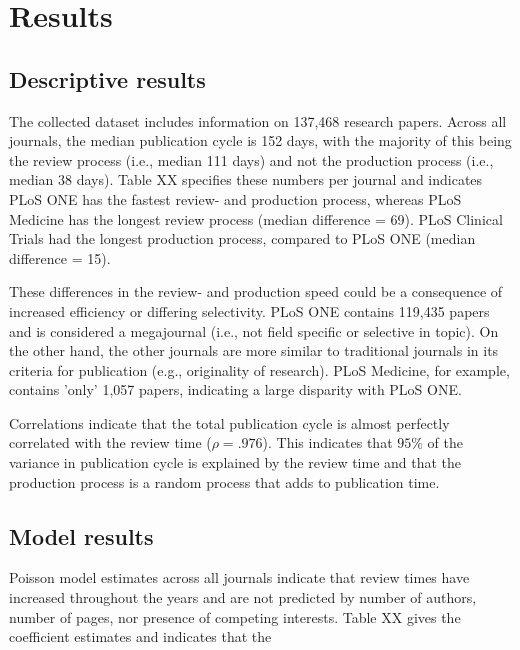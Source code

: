 \section*{Results}
\subsection*{Descriptive results}
The collected dataset includes information on 137,468 research papers. Across all journals, the median publication cycle is 152 days, with the majority of this being the review process (i.e., median 111 days) and not the production process (i.e., median 38 days). Table XX specifies these numbers per journal and indicates PLoS ONE has the fastest review- and production process, whereas PLoS Medicine has the longest review process (median difference = 69). PLoS Clinical Trials had the longest production process, compared to PLoS ONE (median difference = 15).

These differences in the review- and production speed could be a consequence of increased efficiency or differing selectivity. PLoS ONE contains 119,435 papers and is considered a megajournal (i.e., not field specific or selective in topic). On the other hand, the other journals are more similar to traditional journals in its criteria for publication (e.g., originality of research). PLoS Medicine, for example, contains 'only' 1,057 papers, indicating a large disparity with PLoS ONE. 

Correlations indicate that the total publication cycle is almost perfectly correlated with the review time ($\rho=.976$). This indicates that $95\%$ of the variance in publication cycle is explained by the review time and that the production process is a random process that adds to publication time.

\subsection*{Model results}
Poisson model estimates across all journals indicate that review times have increased throughout the years and are not predicted by number of authors, number of pages, nor presence of competing interests. Table XX gives the coefficient estimates and indicates that the 